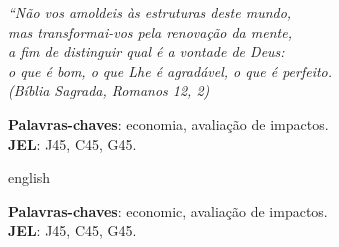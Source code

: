 \documentclass[12pt,english, french, spanish, brazil,a4paper,twoside, openright]{abntex2}	%
\begin{document}
\begin{agradecimentos}


	
\end{agradecimentos}

\begin{epigrafe}
	\vspace*{\fill}
	\begin{flushright}
		\textit{``Não vos amoldeis às estruturas deste mundo, \\
			mas transformai-vos pela renovação da mente, \\
			a fim de distinguir qual é a vontade de Deus: \\
			o que é bom, o que Lhe é agradável, o que é perfeito.\\
			(Bíblia Sagrada, Romanos 12, 2)}
	\end{flushright}
\end{epigrafe}




\setlength{\absparsep}{18pt} %
\begin{resumoumacoluna}
	
	
		\vspace{\onelineskip}
	
	\noindent
	\textbf{Palavras-chaves}: economia, avaliação de impactos. \\	%
	\textbf{JEL}: J45, C45, G45.	%
	
	
	\end{resumoumacoluna}



\setlength{\absparsep}{18pt} %
\begin{resumoumacoluna}[Abstract]
	\begin{otherlanguage*}{english}
		
	
		\vspace{\onelineskip}
	
	\noindent
	\textbf{Palavras-chaves}: economic, avaliação de impactos. \\	%
	\textbf{JEL}: J45, C45, G45.	%
	
	
	\end{otherlanguage*}
		
	
\end{resumoumacoluna}
\end{document}
